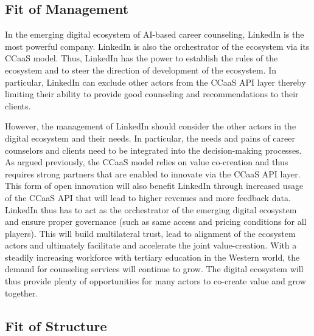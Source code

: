 \subsection{Fit of Management}

In the emerging digital ecosystem of AI-based career counseling, LinkedIn is the most powerful company.
LinkedIn is also the orchestrator of the ecosystem via its CCaaS model. Thus, LinkedIn has the power 
to establish the rules of the ecosystem and to steer the direction of development of the ecosystem. In 
particular, LinkedIn can exclude other actors from the CCaaS API layer thereby limiting their ability
to provide good counseling and recommendations to their clients. 

However, the management of LinkedIn should consider the other actors in the digital ecosystem and their needs.
In particular, the needs and pains of career counselors and clients need to be integrated into the decision-making
processes. As argued previously, the CCaaS model relies on value co-creation and thus requires strong 
partners that are enabled to innovate via the CCaaS API layer. This form of open innovation will also 
benefit LinkedIn through increased usage of the CCaaS API that will lead to higher revenues and more
feedback data. LinkedIn thus has to act as the orchestrator of the emerging digital ecosystem and
ensure proper governance (such as same access and pricing conditions for all players). This will build
multilateral trust, lead to alignment of the ecosystem actors and ultimately facilitate and accelerate
the joint value-creation. With a steadily increasing workforce with tertiary education in the Western
world, the demand for counseling services will continue to grow. The digital ecosystem will thus 
provide plenty of opportunities for many actors to co-create value and grow together.


\subsection{Fit of Structure}

